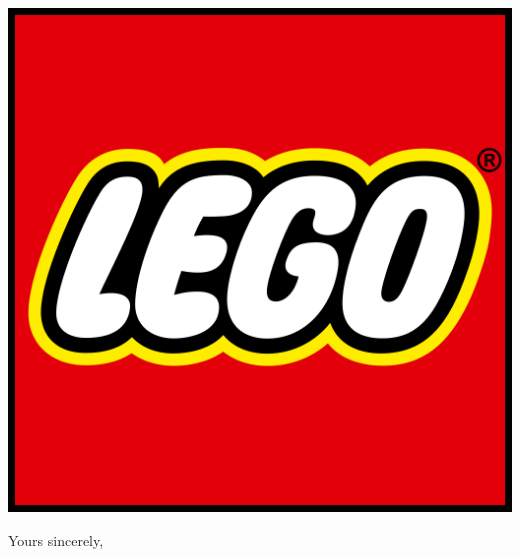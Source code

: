 \documentclass[11pt,a4paper,roman]{moderncv}
\begin{document}


\begin{minipage}[t]{\textwidth}
\includegraphics[height=0.11\textwidth]{images/logo.png}
\end{minipage}


\opening{\vspace*{-2em}}
\closing{Yours sincerely,}{\vspace*{-2em}}  
\makelettertitle{}
\justifying{}


\lipsum[1-4]

\makeletterclosing{}
\end{document}
